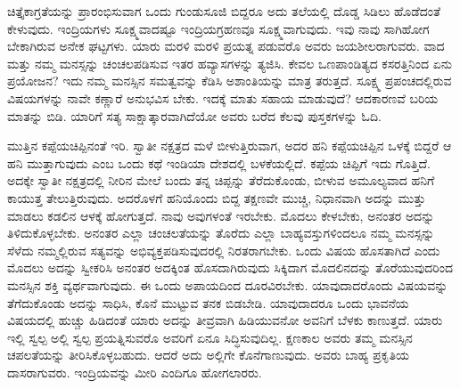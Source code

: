 ಚಿತ್ತೈಕಾಗ್ರತೆಯನ್ನು ಪ್ರಾರಂಭಿಸುವಾಗ ಒಂದು ಗುಂಡುಸೂಜಿ ಬಿದ್ದರೂ ಅದು ತಲೆಯಲ್ಲಿ ದೊಡ್ಡ ಸಿಡಿಲು ಹೊಡೆದಂತೆ ಕೇಳುವುದು. ಇಂದ್ರಿಯಗಳು ಸೂಕ್ಷ್ಮವಾದಷ್ಟೂ ಇಂದ್ರಿಯಗ್ರಹಣವೂ ಸೂಕ್ಷ್ಮವಾಗುವುದು. ಇವು ನಾವು ಸಾಗಿಹೋಗ ಬೇಕಾಗಿರುವ ಅನೇಕ ಘಟ್ಟಗಳು. ಯಾರು ಮರಳಿ ಮರಳಿ ಪ್ರಯತ್ನ ಪಡುವರೊ ಅವರು ಜಯಶೀಲರಾಗುವರು. ವಾದ ಮತ್ತು ನಮ್ಮ ಮನಸ್ಸನ್ನು ಚಂಚಲಪಡಿಸುವ ಇತರ ಹವ್ಯಾಸಗಳನ್ನು ತ್ಯಜಿಸಿ. ಕೇವಲ ಒಣಪಾಂಡಿತ್ಯದ ಕಸರತ್ತಿನಿಂದ ಏನು ಪ್ರಯೋಜನ? ಇದು ನಮ್ಮ ಮನಸ್ಸಿನ ಸಮತ್ವವನ್ನು ಕೆಡಿಸಿ ಅಶಾಂತಿಯನ್ನು ಮಾತ್ರ ತರುತ್ತದೆ. ಸೂಕ್ಷ್ಮ ಪ್ರಪಂಚದಲ್ಲಿರುವ ವಿಷಯಗಳನ್ನು ನಾವೇ ಕಣ್ಣಾರೆ ಅನುಭವಿಸ ಬೇಕು. ಇದಕ್ಕೆ ಮಾತು ಸಹಾಯ ಮಾಡುವುದೆ? ಆದಕಾರಣವೆ ಬರಿಯ ಮಾತನ್ನು ಬಿಡಿ. ಯಾರಿಗೆ ಸತ್ಯ ಸಾಕ್ಷಾತ್ಕಾರವಾಗಿದೆಯೋ ಅವರು ಬರೆದ ಕೆಲವು ಪುಸ್ತಕಗಳನ್ನು ಓದಿ. 

ಮುತ್ತಿನ ಕಪ್ಪೆಯಚಿಪ್ಪಿನಂತೆ ಇರಿ. ಸ್ವಾತೀ ನಕ್ಷತ್ರದ ಮಳೆ ಬೀಳುತ್ತಿರುವಾಗ, ಅದರ ಹನಿ ಕಪ್ಪೆಯಚಿಪ್ಪಿನ ಒಳಕ್ಕೆ ಬಿದ್ದರೆ ಆ ಹನಿ ಮುತ್ತಾಗುವುದು ಎಂಬ ಒಂದು ಕಥೆ ಇಂಡಿಯಾ ದೇಶದಲ್ಲಿ ಬಳಕೆಯಲ್ಲಿದೆ. ಕಪ್ಪೆಯ ಚಿಪ್ಪಿಗೆ ಇದು ಗೊತ್ತಿದೆ. ಅದಕ್ಕೇ ಸ್ವಾತೀ ನಕ್ಷತ್ರದಲ್ಲಿ ನೀರಿನ ಮೇಲೆ ಬಂದು ತನ್ನ ಚಿಪ್ಪನ್ನು ತೆರೆದುಕೊಂಡು, ಬೀಳುವ ಅಮೂಲ್ಯವಾದ ಹನಿಗೆ ಕಾಯುತ್ತ ತೇಲುತ್ತಿರುವುದು. ಅದರೊಳಗೆ ಹನಿಯೊಂದು ಬಿದ್ದ ತಕ್ಷಣವೇ ಮುಚ್ಚಿ, ನಿಧಾನವಾಗಿ ಅದನ್ನು ಮುತ್ತು ಮಾಡಲು ಕಡಲಿನ ಆಳಕ್ಕೆ ಹೋಗುತ್ತದೆ. ನಾವು ಅವುಗಳಂತೆ ಇರಬೇಕು. ಮೊದಲು ಕೇಳಬೇಕು, ಅನಂತರ ಅದನ್ನು ತಿಳಿದುಕೊಳ್ಳಬೇಕು. ಅನಂತರ ಎಲ್ಲಾ ಚಂಚಲತೆಯನ್ನು ತೊರೆದು ಎಲ್ಲಾ ಬಾಹ್ಯವಸ್ತುಗಳಿಂದಲೂ ನಮ್ಮ ಮನಸ್ಸನ್ನು ಸೆಳೆದು ನಮ್ಮಲ್ಲಿರುವ ಸತ್ಯವನ್ನು ಅಭಿವ್ಯಕ್ತಪಡಿಸುವುದರಲ್ಲಿ ನಿರತರಾಗಬೇಕು. ಒಂದು ವಿಷಯ ಹೊಸತಾಗಿದೆ ಎಂದು ಮೊದಲು ಅದನ್ನು ಸ್ವೀಕರಿಸಿ ಅನಂತರ ಅದಕ್ಕಿಂತ ಹೊಸದಾಗಿರುವುದು ಸಿಕ್ಕಿದಾಗ ಮೊದಲಿನದನ್ನು ತೊರೆಯುವುದರಿಂದ ಮನಸ್ಸಿನ ಶಕ್ತಿ ವ್ಯರ್ಥವಾಗುವುದು. ಈ ಒಂದು ಅಪಾಯದಿಂದ ದೂರವಿರಬೇಕು. ಯಾವುದಾದರೊಂದು ವಿಷಯವನ್ನು ತೆಗೆದುಕೊಂಡು ಅದನ್ನು ಸಾಧಿಸಿ, ಕೊನೆ ಮುಟ್ಟುವ ತನಕ ಬಿಡಬೇಡಿ. ಯಾವುದಾದರೂ ಒಂದು ಭಾವನೆಯ ವಿಷಯದಲ್ಲಿ ಹುಚ್ಚು ಹಿಡಿದಂತೆ ಯಾರು ಅದನ್ನು ತೀವ್ರವಾಗಿ ಹಿಡಿಯುವನೋ ಅವನಿಗೆ ಬೆಳಕು ಕಾಣುತ್ತದೆ. ಯಾರು ಇಲ್ಲಿ ಸ್ವಲ್ಪ ಅಲ್ಲಿ ಸ್ವಲ್ಪ ಪ್ರಯತ್ನಿಸುವರೊ ಅವರಿಗೆ ಏನೂ ಸಿದ್ಧಿಸುವುದಿಲ್ಲ. ಕ್ಷಣಕಾಲ ಅವರು ತಮ್ಮ ಮನಸ್ಸಿನ ಚಪಲತೆಯನ್ನು ತೀರಿಸಿಕೊಳ್ಳಬಹುದು. ಆದರೆ ಅದು ಅಲ್ಲಿಗೇ ಕೊನೆಗಾಣುವುದು. ಅವರು ಬಾಹ್ಯ ಪ್ರಕೃತಿಯ ದಾಸರಾಗುವರು. ಇಂದ್ರಿಯವನ್ನು ಮೀರಿ ಎಂದಿಗೂ ಹೋಗಲಾರರು. 


